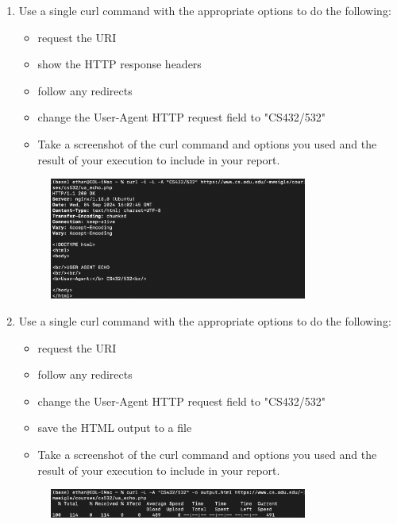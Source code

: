 \documentclass[12pt]{article}
\begin{document}
\begin{enumerate}
    \item Use a single curl command with the appropriate options to do the following:
    \begin{itemize}
        \item request the URI
        \item show the HTTP response headers
        \item follow any redirects
        \item change the User-Agent HTTP request field to "CS432/532"
        \item[] Take a screenshot of the curl command and options you used and the result of your execution to include in your report.
    \end{itemize}
    \begin{figure}[h!]
        \centering
        \includegraphics[width=0.8\textwidth] {q2-b.jpg}
        \label{fig:q2-b}
    \end{figure}

    \item Use a single curl command with the appropriate options to do the following:
    \begin{itemize}
        \item request the URI
        \item follow any redirects
        \item change the User-Agent HTTP request field to "CS432/532"
        \item save the HTML output to a file
        \item[] Take a screenshot of the curl command and options you used and the result of your execution to include in your report.
    \end{itemize}
    \begin{figure}[h!]
        \centering
        \includegraphics[width=0.8\textwidth] {q2-c.jpg}
        \label{fig:q2-c}
    \end{figure}


\end{enumerate}
\end{document}
